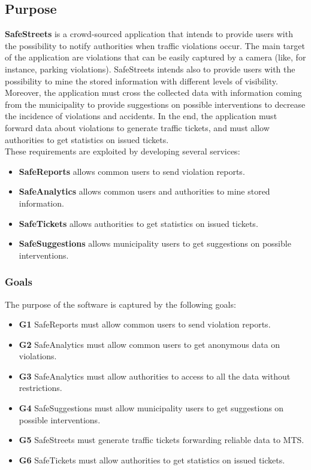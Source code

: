 \documentclass[./main.tex]{subfiles}
\begin{document}
\subsection{Purpose}

\textbf{SafeStreets} is a crowd-sourced application that intends to
provide users with the possibility to notify authorities when traffic
violations occur. The main target of the application are violations that
can be easily captured by a camera (like, for instance, parking
violations). SafeStreets intends also to provide users with the
possibility to mine the stored information with different levels of
visibility. Moreover, the application must cross the collected data with
information coming from the municipality to provide suggestions on
possible interventions to decrease the incidence of violations and
accidents. In the end, the application must forward data about
violations to generate traffic tickets, and must allow authorities to
get statistics on issued tickets.
\medskip\\
These requirements are exploited by developing several services:
\begin{itemize}
\item
  \textbf{SafeReports} allows common users to send violation reports.
\item
  \textbf{SafeAnalytics} allows common users and authorities to mine
  stored information.
\item
  \textbf{SafeTickets} allows authorities to get statistics on issued
  tickets.
\item
  \textbf{SafeSuggestions} allows municipality users to get suggestions
  on possible interventions.
\end{itemize}

\subsubsection{Goals}

The purpose of the software is captured by the following goals:
\begin{itemize}
\item
  \textbf{G1} SafeReports must allow common users to send violation
  reports.
\item
  \textbf{G2} SafeAnalytics must allow common users to get anonymous
  data on violations.
\item
  \textbf{G3} SafeAnalytics must allow authorities to access to all the
  data without restrictions.
\item
  \textbf{G4} SafeSuggestions must allow municipality users to get
  suggestions on possible interventions.
\item
  \textbf{G5} SafeStreets must generate traffic tickets forwarding
  reliable data to MTS.
\item
  \textbf{G6} SafeTickets must allow authorities to get statistics on
  issued tickets.
\end{itemize}
\end{document}
